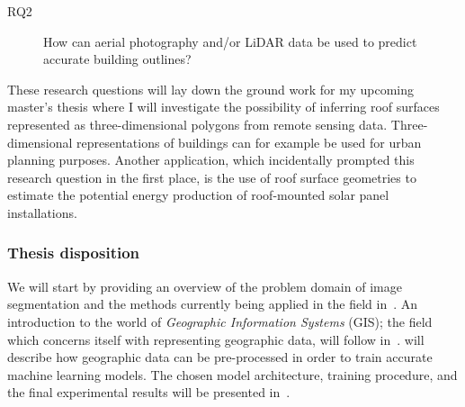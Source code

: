 \begin{description}
  \item[RQ2] How can aerial photography and/or LiDAR data be used to predict accurate building outlines?
\end{description}

These research questions will lay down the ground work for my upcoming master's thesis where I will investigate the possibility of inferring roof surfaces represented as three-dimensional polygons from remote sensing data.
Three-dimensional representations of buildings can for example be used for urban planning purposes.
Another application, which incidentally prompted this research question in the first place, is the use of roof surface geometries to estimate the potential energy production of roof-mounted solar panel installations.

\subsubsection*{Thesis disposition}

We will start by providing an overview of the problem domain of image segmentation and the methods currently being applied in the field in~.
An introduction to the world of \textit{Geographic Information Systems} (GIS); the field which concerns itself with representing geographic data, will follow in~.
 will describe how geographic data can be pre-processed in order to train accurate machine learning models.
The chosen model architecture, training procedure, and the final experimental results will be presented in~.
